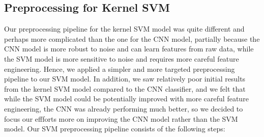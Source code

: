 \documentclass[10pt]{article} %
\begin{document}
\subsection{Preprocessing for Kernel SVM}
Our preprocessing pipeline for the kernel SVM model was quite different and perhaps more complicated than the one for the CNN model, partially because the CNN model is more robust to noise and can learn features from raw data, while the SVM model is more sensitive to noise and requires more careful feature engineering. Hence, we applied a simpler and more targeted preprocessing pipeline to our SVM model. In addition, we saw relatively poor initial results from the kernel SVM model compared to the CNN classifier, and we felt that while the SVM model could be potentially improved with more careful feature engineering, the CNN was already performing much better, so we decided to focus our effforts more on improving the CNN model rather than the SVM model. Our SVM preprocessing pipeline consists of the following steps:
\end{document}
